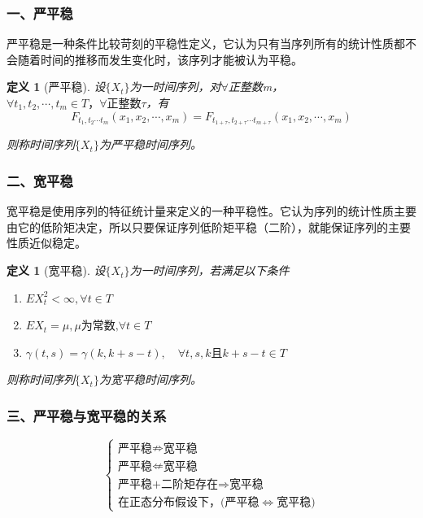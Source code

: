 \documentclass[12pt, a4paper, oneside]{ctexbook}
\newtheorem{definition}[theorem]{定义}
\begin{document}
\subsubsection{一、严平稳}
严平稳是一种条件比较苛刻的平稳性定义，它认为只有当序列所有的统计性质都不会随着时间的推移而发生变化时，该序列才能被认为平稳。
\begin{definition}[严平稳]
    设$\{X_t\}$为一时间序列，对$\forall$正整数m，$\forall t_1,t_2,\cdots,t_m\in T\text{，}\forall\text{正整数}\tau$，有
    \begin{equation}
        F_{t_1,t_2\cdots t_m}\left(x_1,x_2,\cdots,x_m\right)=F_{t_{1+\tau},t_{2+\tau}\cdots t_{m+\tau}}\left(x_1,x_2,\cdots,x_m\right)
    \end{equation}
    \par 则称时间序列$\{X_t\}$为严平稳时间序列。
\end{definition}

\subsubsection{二、宽平稳}
宽平稳是使用序列的特征统计量来定义的一种平稳性。它认为序列的统计性质主要由它的低阶矩决定，所以只要保证序列低阶矩平稳（二阶），就能保证序列的主要性质近似稳定。

\begin{definition}[宽平稳]
    设$\{X_t\}$为一时间序列，若满足以下条件
    \begin{enumerate}[1.]
        \item $EX_t^2<\infty,\forall t\in T$
        \item $EX_t=\mu,\mu\text{为常数,}\forall t\in T$
        \item $\gamma(t,s)=\gamma(k,k+s-t),\quad\forall t,s,k\text{且}k+s-t\in T$
    \end{enumerate}
    \par 则称时间序列$\{X_t\}$为宽平稳时间序列。
\end{definition}

\subsubsection{三、严平稳与宽平稳的关系}
\begin{equation*}
    \left\{ \begin{array}{l}
        \text{严平稳} \nRightarrow  \text{宽平稳}            \\
        \text{严平稳} \nLeftarrow  \text{宽平稳}             \\
        \text{严平稳+二阶矩存在}  \Rightarrow  \text{宽平稳} \\
        \text{在正态分布假设下，(严平稳} \Leftrightarrow \text{宽平稳})
    \end{array} \right.
\end{equation*}
\end{document}
